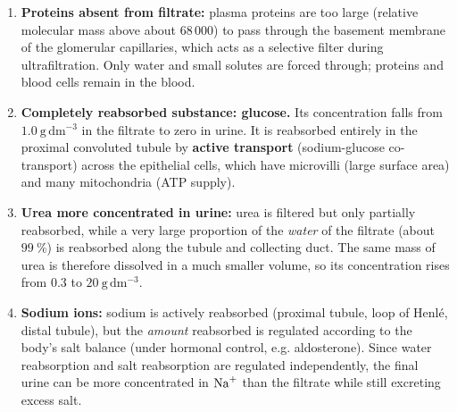 \documentclass[11pt]{article}
\newcommand{\cle}[1]{{\popxbold\color{popdark}#1}}
\begin{document}
\begin{corrige}
\begin{enumerate}
\item \textbf{Proteins absent from filtrate:} plasma proteins are too large (relative molecular mass above about 68\,000) to pass through the basement membrane of the glomerular capillaries, which acts as a selective filter during ultrafiltration. Only water and small solutes are forced through; proteins and blood cells remain in the blood.
\item \textbf{Completely reabsorbed substance: glucose.} Its concentration falls from $1.0\ \mathrm{g\,dm^{-3}}$ in the filtrate to zero in urine. It is reabsorbed entirely in the \cle{proximal convoluted tubule} by \textbf{active transport} (sodium-glucose co-transport) across the epithelial cells, which have microvilli (large surface area) and many mitochondria (ATP supply).
\item \textbf{Urea more concentrated in urine:} urea is filtered but only partially reabsorbed, while a very large proportion of the \emph{water} of the filtrate (about $99\ \%$) is reabsorbed along the tubule and collecting duct. The same mass of urea is therefore dissolved in a much smaller volume, so its concentration rises from $0.3$ to $20\ \mathrm{g\,dm^{-3}}$.
\item \textbf{Sodium ions:} sodium is actively reabsorbed (proximal tubule, loop of Henl\'e, distal tubule), but the \emph{amount} reabsorbed is regulated according to the body's salt balance (under hormonal control, e.g. aldosterone). Since water reabsorption and salt reabsorption are regulated independently, the final urine can be more concentrated in $\ce{Na+}$ than the filtrate while still excreting excess salt.
\end{enumerate}
\end{corrige}
\end{document}
